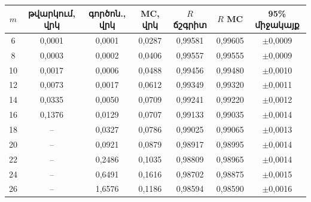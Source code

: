 \begin{tabular}{|c|c|c|c|c|c|c|}
\hline
$m$ & թվարկում, վրկ & գործոն., վրկ & MC, վրկ & $R$ ճշգրիտ & $R$ MC & 95\% միջակայք\\
\hline
6 & 0{,}0001 & 0{,}0001 & 0{,}0287 & 0{,}99581 & 0{,}99605 & $\pm$0{,}0009\\
\hline
8 & 0{,}0003 & 0{,}0002 & 0{,}0406 & 0{,}99557 & 0{,}99555 & $\pm$0{,}0009\\
\hline
10 & 0{,}0017 & 0{,}0006 & 0{,}0488 & 0{,}99456 & 0{,}99480 & $\pm$0{,}0010\\
\hline
12 & 0{,}0073 & 0{,}0017 & 0{,}0612 & 0{,}99349 & 0{,}99320 & $\pm$0{,}0011\\
\hline
14 & 0{,}0335 & 0{,}0050 & 0{,}0709 & 0{,}99241 & 0{,}99220 & $\pm$0{,}0012\\
\hline
16 & 0{,}1376 & 0{,}0129 & 0{,}0707 & 0{,}99133 & 0{,}99035 & $\pm$0{,}0014\\
\hline
18 & -- & 0{,}0327 & 0{,}0786 & 0{,}99025 & 0{,}99065 & $\pm$0{,}0013\\
\hline
20 & -- & 0{,}0921 & 0{,}0879 & 0{,}98917 & 0{,}98995 & $\pm$0{,}0014\\
\hline
22 & -- & 0{,}2486 & 0{,}1035 & 0{,}98809 & 0{,}98965 & $\pm$0{,}0014\\
\hline
24 & -- & 0{,}6491 & 0{,}1616 & 0{,}98702 & 0{,}98875 & $\pm$0{,}0015\\
\hline
26 & -- & 1{,}6576 & 0{,}1186 & 0{,}98594 & 0{,}98590 & $\pm$0{,}0016\\
\hline
\end{tabular}
